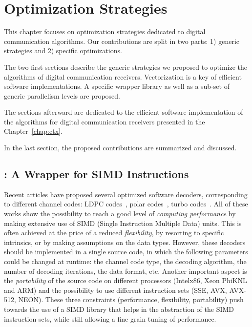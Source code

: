 
\renewcommand{\curChapter}{main/chapter2}

\chapter{Optimization Strategies}
\label{chap:opt}

This chapter focuses on optimization strategies dedicated to digital
communication algorithms. Our contributions are split in two parts: 1) generic
strategies and 2) specific optimizations.

The two first sections describe the generic strategies we proposed to optimize
the algorithms of digital communication receivers. Vectorization is a key of
efficient software implementations. A specific wrapper library as well as a
sub-set of generic parallelism levels are proposed.

The sections afterward are dedicated to the efficient software implementation of
the algorithms for digital communication receivers presented in the
Chapter~\ref{chap:ctx}.

In the last section, the proposed contributions are summarized and discussed.

\vspace*{\fill}
\minitoccustom
\vspace*{\fill}

\newpage
\section{\MIPP: A \Cxx Wrapper for SIMD Instructions}
\label{sec:opt_mipp}

Recent articles have proposed several optimized software decoders, corresponding
to different channel codes: LDPC codes~\cite{LeGal2015,LeGal2016,LeGal2017a},
polar codes~\cite{Giard2016b,Sarkis2016,Cassagne2015c,Cassagne2016b,
Leonardon2019}, turbo codes~\cite{Zhang2012,Wu2013,Cassagne2016a,LeGal2019a}.
All of these works show the possibility to reach a good level of
\textit{computing performance} by making extensive use of SIMD (Single
Instruction Multiple Data) units. This is often achieved at the price of a
reduced \textit{flexibility}, by resorting to specific intrinsics, or by making
assumptions on the data types. However, these decoders should be implemented in
a single source code, in which the following parameters could be changed at
runtime: the channel code type, the decoding algorithm, the number of decoding
iterations, the data format, etc. Another important aspect is the
\textit{portability} of the source code on different processors (Intel\R x86,
Xeon Phi\TM KNL and ARM\R) and the possibility to use different instruction sets
(SSE, AVX, AVX-512, NEON). These three constraints (performance, flexibility,
portability) push towards the use of a SIMD library that helps in the
abstraction of the SIMD instruction sets, while still allowing a fine grain
tuning of performance.

